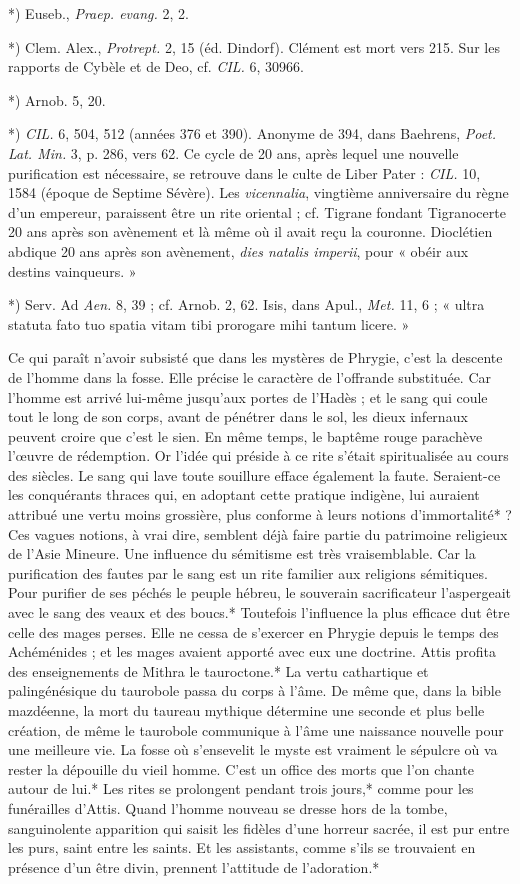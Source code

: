 \documentclass[a4paper, 11pt, oneside, polutonikogreek, french]{article}
\begin{document}
*) Euseb., \emph{Praep. evang.} 2, 2.

*) Clem. Alex., \emph{Protrept.} 2, 15 (éd. Dindorf). Clément est mort vers 215. Sur les rapports de Cybèle et de Deo, cf. \emph{CIL.} 6, 30966.

*) Arnob. 5, 20.

*) \emph{CIL.} 6, 504, 512 (années 376 et 390). Anonyme de 394, dans Baehrens, \emph{Poet. Lat. Min.} 3, p. 286, vers 62. Ce cycle de 20 ans, après lequel une nouvelle purification est nécessaire, se retrouve dans le culte de Liber Pater : \emph{CIL.} 10, 1584 (époque de Septime Sévère). Les \emph{vicennalia}, vingtième anniversaire du règne d'un empereur, paraissent être un rite oriental ; cf. Tigrane fondant Tigranocerte 20 ans après son avènement et là même où il avait reçu la couronne. Dioclétien abdique 20 ans après son avènement, \emph{dies natalis imperii}, pour « obéir aux destins vainqueurs. »

*) Serv. Ad \emph{Aen.} 8, 39 ; cf. Arnob. 2, 62. Isis, dans Apul., \emph{Met.} 11, 6 ; « ultra statuta fato tuo spatia vitam tibi prorogare mihi tantum licere. »

Ce qui paraît n'avoir subsisté que dans les mystères de Phrygie, c'est la descente de l'homme dans la fosse. Elle précise le caractère de l'offrande substituée. Car l'homme est arrivé lui-même jusqu'aux portes de l'Hadès ; et le sang qui coule tout le long de son corps, avant de pénétrer dans le sol, les dieux infernaux peuvent croire que c'est le sien. En même temps, le baptême rouge parachève l'œuvre de rédemption. Or l'idée qui préside à ce rite s'était spiritualisée au cours des siècles. Le sang qui lave toute souillure efface également la faute. Seraient-ce les conquérants thraces qui, en adoptant cette pratique indigène, lui auraient attribué une vertu moins grossière, plus conforme à leurs notions d'immortalité* ? Ces vagues notions, à vrai dire, semblent déjà faire partie du patrimoine religieux de l'Asie Mineure. Une influence du sémitisme est très vraisemblable. Car la purification des fautes par le sang est un rite familier aux religions sémitiques. Pour purifier de ses péchés le peuple hébreu, le souverain sacrificateur l'aspergeait avec le sang des veaux et des boucs.* Toutefois l'influence la plus efficace dut être celle des mages perses. Elle ne cessa de s'exercer en Phrygie depuis le temps des Achéménides ; et les mages avaient apporté avec eux une doctrine. Attis profita des enseignements de Mithra le tauroctone.* La vertu cathartique et palingénésique du taurobole passa du corps à l'âme. De même que, dans la bible mazdéenne, la mort du taureau mythique détermine une seconde et plus belle création, de même le taurobole communique à l'âme une naissance nouvelle pour une meilleure vie. La fosse où s'ensevelit le myste est vraiment le sépulcre où va rester la dépouille du vieil homme. C'est un office des morts que l'on chante autour de lui.* Les rites se prolongent pendant trois jours,* comme pour les funérailles d'Attis. Quand l'homme nouveau se dresse hors de la tombe, sanguinolente apparition qui saisit les fidèles d'une horreur sacrée, il est pur entre les purs, saint entre les saints. Et les assistants, comme s'ils se trouvaient en présence d'un être divin, prennent l'attitude de l'adoration.*
\end{document}
